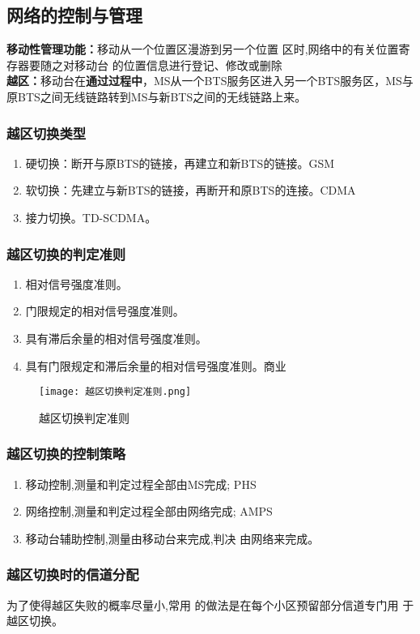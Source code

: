 	\subsection{网络的控制与管理}
	\textbf{移动性管理功能：}移动从一个位置区漫游到另一个位置
	区时,网络中的有关位置寄存器要随之对移动台
	的位置信息进行登记、修改或删除 \\
	\textbf{越区：}移动台在\textbf{通过过程中}，MS从一个BTS服务区进入另一个BTS服务区，MS与原BTS之间无线链路转到MS与新BTS之间的无线链路上来。
	\subsubsection{越区切换类型}
	\begin{enumerate}
		\item 硬切换：断开与原BTS的链接，再建立和新BTS的链接。GSM
		\item 软切换：先建立与新BTS的链接，再断开和原BTS的连接。CDMA
		\item 接力切换。TD-SCDMA。
	\end{enumerate}
	\subsubsection{越区切换的判定准则}
	\begin{enumerate}
		\item 相对信号强度准则。
		\item 门限规定的相对信号强度准则。
		\item 具有滞后余量的相对信号强度准则。
		\item 具有门限规定和滞后余量的相对信号强度准则。商业
	\end{enumerate}
	\begin{figure}[H]
		\centering
		\texttt{[image: 越区切换判定准则.png]}
		\caption{越区切换判定准则}
	\end{figure}
	\subsubsection{越区切换的控制策略
	}
	\begin{enumerate}
		\item 移动控制,测量和判定过程全部由MS完成;
		PHS
		\item 网络控制,测量和判定过程全部由网络完成;
		AMPS
		\item 移动台辅助控制,测量由移动台来完成,判决
		由网络来完成。
	\end{enumerate}
	\subsubsection{越区切换时的信道分配
	}
	为了使得越区失败的概率尽量小,常用
	的做法是在每个小区预留部分信道专门用
	于越区切换。
